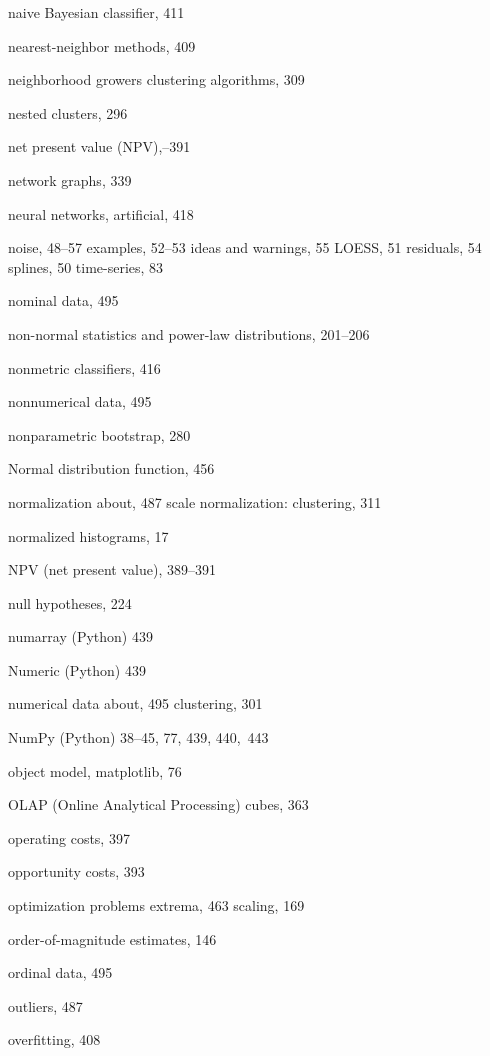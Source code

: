 \documentclass{Oreilly5980006}
\begin{document}
\begin{theindex}
  \item naive Bayesian classifier, 411
  \item nearest-neighbor methods, 409
  \item neighborhood growers clustering algorithms, 309
  \item nested clusters, 296
  \item net present value (NPV),--391
  \item network graphs, 339
  \item neural networks, artificial, 418
  \item noise, 48--57
    \subitem examples, 52--53
    \subitem ideas and warnings, 55
    \subitem LOESS, 51
    \subitem residuals, 54
    \subitem splines, 50
    \subitem time-series, 83
  \item nominal data, 495
  \item non-normal statistics and power-law distributions, 201--206
  \item nonmetric classifiers, 416
  \item nonnumerical data, 495
  \item nonparametric bootstrap, 280
  \item Normal distribution function, 456
  \item normalization
    \subitem about, 487
    \subitem scale normalization: clustering, 311
  \item normalized histograms, 17
  \item NPV (net present value), 389--391
  \item null hypotheses, 224
  \item numarray (Python) 439
  \item Numeric  (Python) 439
  \item numerical data
    \subitem about, 495
    \subitem clustering, 301
  \item NumPy  (Python) 38--45, 77, 439, 440,~443 

  \indexspace

  \item object model, matplotlib, 76
  \item OLAP (Online Analytical Processing) cubes, 363
  \item operating costs, 397
  \item opportunity costs, 393
  \item optimization problems
    \subitem extrema, 463
    \subitem scaling, 169
  \item order-of-magnitude estimates, 146
  \item ordinal data, 495
  \item outliers, 487
  \item overfitting, 408\vspace*{-3pt}


\end{theindex}
\end{document}
